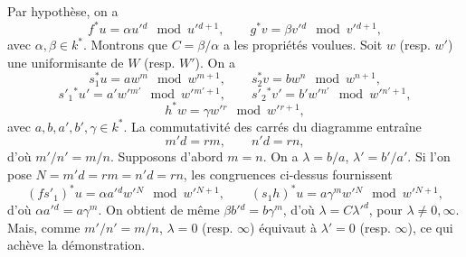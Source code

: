 \documentclass[11pt]{article}
\begin{document}
Par hypothèse, on a
\[
f^*u=\alpha u'{}^d\mod {u'{}^{d+1}},\qquad
g^*v=\beta v'{}^d\mod {v'{}^{d+1}},
\]
avec $\alpha,\beta\in k^*$. Montrons que $C=\beta/\alpha$ a les propriétés voulues. Soit $w$ (resp. $w'$) une uniformisante de $W$ (resp. $W'$). On a
\[
s_1^*u=aw^m\mod {w^{m+1}},\qquad
s_2^*v=bw^n\mod {w^{n+1}},
\]
\[
s'_1{}^*u'=a'w'{}^{m'}\mod {w'{}^{m'+1}},\qquad
s'_2{}^*v'=b'w'{}^{n'}\mod {w'{}^{n'+1}},
\]
\[
h^*w=\gamma w'{}^r\mod {w'{}^{r+1}},
\]
avec $a,b,a',b',\gamma\in k^*$. La commutativité des carrés du diagramme entraîne
\[
m'd=rm,\qquad n'd=rn,
\]
d'où $m'/n'=m/n$.
Supposons d'abord $m=n$. On a $\lambda=b/a$, $\lambda'=b'/a'$. Si l'on pose $N=m'd=rm=n'd=rn$, les congruences ci-dessus fournissent
\[
(fs'_1)^*u=\alpha a'{}^d w'{}^N\mod {w'{}^{N+1}},\qquad
(s_1h)^*u=a\gamma^m w'{}^N\mod {w'{}^{N+1}},
\]
d'où $\alpha a'{}^d=a\gamma^m$. On obtient de même $\beta b'{}^d=b\gamma^m$, d'où $\lambda=C{\lambda'}^d$, pour $\lambda\ne 0,\infty$. Mais, comme $m'/n'=m/n$, $\lambda=0$ (resp. $\infty$) équivaut à $\lambda'=0$ (resp. $\infty$), ce qui achève la démonstration.
\end{document}
